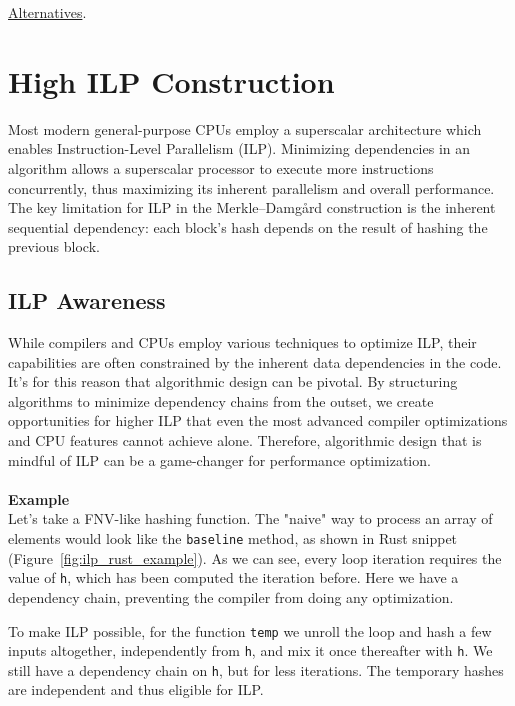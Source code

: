 \documentclass[11pt]{article}
\begin{document}
\href{https://www.researchgate.net/publication/322094216_Merkle-Damgard_Construction_Method_and_Alternatives_A_Review}{Alternatives}.

\section{High ILP Construction} \label{highilp}

Most modern general-purpose CPUs employ a superscalar architecture which enables Instruction-Level Parallelism (ILP). 
Minimizing dependencies in an algorithm allows a superscalar processor to execute more instructions concurrently, thus maximizing its inherent parallelism and overall performance.
The key limitation for ILP in the Merkle–Damgård construction is the inherent sequential dependency: each block's hash depends on the result of hashing the previous block.

\subsection{ILP Awareness}

While compilers and CPUs employ various techniques to optimize ILP, their capabilities are often constrained by the inherent data dependencies in the code. It's for this reason that algorithmic design can be pivotal. By structuring algorithms to minimize dependency chains from the outset, we create opportunities for higher ILP that even the most advanced compiler optimizations and CPU features cannot achieve alone. Therefore, algorithmic design that is mindful of ILP can be a game-changer for performance optimization.
\\\\
\textbf{Example}\\
Let's take a FNV-like hashing function. The "naive" way to process an array of elements would look like the \texttt{baseline} method, as shown in Rust snippet (Figure~\ref{fig:ilp_rust_example}). As we can see, every loop iteration requires the value of \texttt{h}, which has been computed the iteration before. Here we have a dependency chain, preventing the compiler from doing any optimization.

To make ILP possible, for the function \texttt{temp} we unroll the loop and hash a few inputs altogether, independently from \texttt{h}, and mix it once thereafter with \texttt{h}. We still have a dependency chain on \texttt{h}, but for less iterations. The temporary hashes are independent and thus eligible for ILP.
\end{document}
